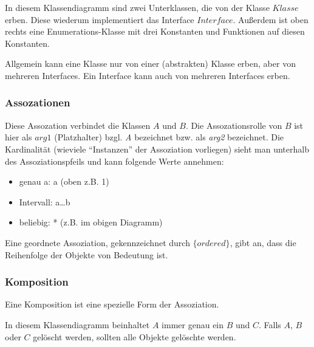 \documentclass{panikzettel}
\begin{document}
In diesem Klassendiagramm sind zwei Unterklassen, die von der Klasse $\textit{Klasse}$ erben.
Diese wiederum implementiert das Interface $\textit{Interface}$.
Außerdem ist oben rechts eine Enumerations-Klasse mit drei Konstanten und Funktionen auf diesen Konstanten.

Allgemein kann eine Klasse nur von einer (abstrakten) Klasse erben, aber von mehreren Interfaces.
Ein Interface kann auch von mehreren Interfaces erben.

\subsubsection{Assozationen}

Diese Assozation verbindet die Klassen $\textit{A}$ und $\textit{B}$.
Die Assozationsrolle von $\textit{B}$ ist hier als $\textit{arg1}$ (Platzhalter) bzgl. \textit{A} bezeichnet bzw. als \textit{arg2} bezeichnet.
Die Kardinalität (wieviele ``Instanzen''  der Assoziation vorliegen) sieht man unterhalb des Assoziationspfeils und kann folgende Werte annehmen:
\begin{itemize}
  \item genau a: a (oben z.B. 1)
  \item Intervall: a\ldots b
  \item beliebig: * (z.B. im obigen Diagramm)
\end{itemize}

Eine geordnete Assoziation, gekennzeichnet durch $\textit{\{ordered\}}$, gibt an, dass die Reihenfolge der Objekte von Bedeutung ist.

\subsubsection{Komposition}
Eine Komposition ist eine spezielle Form der Assoziation.


In diesem Klassendiagramm beinhaltet $\textit{A}$ immer genau ein $\textit{B}$  und $\textit{C}$.
Falls $\textit{A}$, $\textit{B}$ oder $\textit{C}$ gelöscht werden, sollten alle Objekte gelöschte werden.
\end{document}
